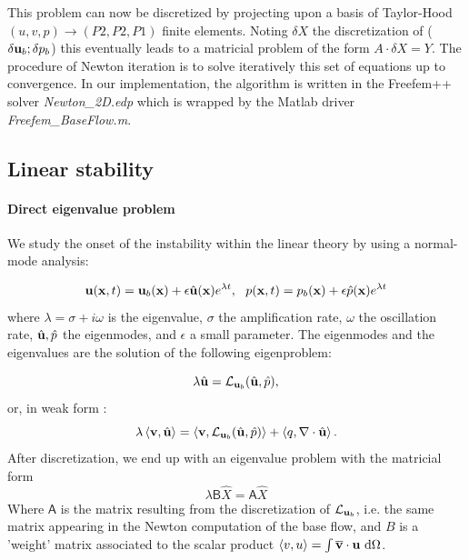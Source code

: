 \documentclass[twocolumn,10pt]{asme2ej}
\newcommand{\be}[1]{ \begin{equation} \label{#1}}
\newcommand{\ee}{\end{equation}}
\begin{document}
This problem can now be discretized by projecting upon a basis of Taylor-Hood $(u,v,p) \rightarrow (P2,P2,P1)$ finite elements. Noting $\delta X$ the discretization of ($\delta {\bf u}_b;\delta p_b$) this eventually leads to a matricial problem of the form $A \cdot \delta X = Y$. The procedure of Newton iteration is to solve iteratively this set of equations up to convergence.
In our implementation, the algorithm is written in the Freefem++ solver {\em Newton\_2D.edp} 
which is wrapped by the Matlab driver {\em Freefem\_BaseFlow.m}.

\subsection{Linear stability}
\vspace{.2cm}

\paragraph{Direct eigenvalue problem}
We study the onset of the instability within the linear theory by using a normal-mode analysis:

\be{startmodepropre}
{\bf u} ({\bf{x}},t) = {\bf u}_b({\bf{x}}) + \epsilon \hat{\bf u}({\bf{x}}) e^{\lambda t}, \,\,\,\, {p}({\bf{x}},t) = {p}_b({\bf{x}}) + \epsilon \hat{p}({\bf{x}}) e^{\lambda t}
\ee
where $\lambda = \sigma + i \omega$ is the eigenvalue, $\sigma$ the amplification rate,
$\omega$ the oscillation rate, $\hat{{\bf u}},\hat{p}$ the eigenmodes, and $\epsilon$ a small parameter.
The eigenmodes and the eigenvalues are the solution of the following eigenproblem:
 
\be{LEP}
\lambda \hat{{\bf u}} = {\cal L}_{{\bf u}_b}( \hat{\bf u},\hat{p}),
\ee
or, in weak form : 
\be{eigenvalueproblem}
\lambda \left< {\bf v} , \hat{{\bf u}} \right> = \left< {\bf v}, {\cal L}_{{\bf u}_b} ( \hat{\bf u},\hat{p})\right> + \left< q, \nabla \cdot \hat{\bf u} \right>.
\ee
After discretization, we end up with an eigenvalue problem with the matricial form
\be{Eigen_matricial}
\lambda {\mathsf{B}} \hat{X} = {\mathsf{A}} \hat{X}
\ee
Where ${\mathsf{A}}$ is the matrix resulting from the discretization of ${\cal L}_{{\bf u}_b}$, i.e. the same matrix  appearing in the Newton computation of the base flow, and  $B$ is a 'weight' matrix associated to the scalar product $\left<v,u\right> = \int \overline{\bf v} \cdot {\bf u} \mbox{ d} \Omega$.
\end{document}
